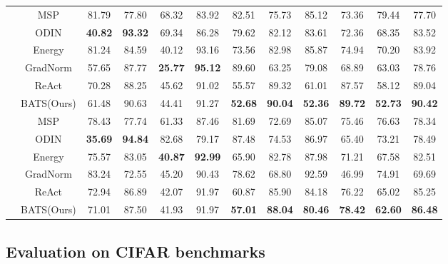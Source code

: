 \documentclass{article}
\begin{document}
\begin{table}[htbp]
{\begin{tabular}{cccccccccccc}
 & MSP\cite{hendrycks17baseline} & 81.79 & 77.80 & 68.32 & 83.92 & 82.51 & 75.73 & 85.12 & 73.36 & 79.44 & 77.70 \\
 & ODIN\cite{ODIN} & \textbf{40.82} & \textbf{93.32} & 69.34 & 86.28 & 79.62 & 82.12 & 83.61 & 72.36 & 68.35 & 83.52 \\
 & Energy\cite{liu2020energy} & 81.24 & 84.59 & 40.12 & 93.16 & 73.56 & 82.98 & 85.87 & 74.94 & 70.20 & 83.92 \\
 & GradNorm\cite{huang2021importance} & 57.65 & 87.77 & \textbf{25.77} & \textbf{95.12} & 89.60 & 63.25 & 79.08 & 68.89 & 63.03 & 78.76 \\
 & ReAct\cite{sun2021react} & 70.28 & 88.25 & 45.62 & 91.02 & 55.57 & 89.32 & 61.01 & 87.57 & 58.12 & 89.04 \\
 & BATS(Ours) & 61.48 & 90.63 & 44.41 & 91.27 & \textbf{52.68} & \textbf{90.04} & \textbf{52.36} & \textbf{89.72} & \textbf{52.73} & \textbf{90.42} \\ \hline 

  & MSP\cite{hendrycks17baseline} & 78.43 & 77.74 & 61.33 & 87.46 & 81.69 & 72.69 & 85.07 & 75.46 & 76.63 & 78.34 \\
 & ODIN\cite{ODIN} & \textbf{35.69} & \textbf{94.84} & 82.68 & 79.17 & 87.48 & 74.53 & 86.97 & 65.40 & 73.21 & 78.49 \\
 & Energy\cite{liu2020energy} & 75.57 & 83.05 & \textbf{40.87} & \textbf{92.99} & 65.90 & 82.78 & 87.98 & 71.21 & 67.58 & 82.51 \\
 & GradNorm\cite{huang2021importance} & 83.24 & 72.55 & 45.20 & 90.43 & 78.62 & 68.80 & 92.59 & 46.99 & 74.91 & 69.69 \\
 & ReAct\cite{sun2021react} & 72.94 & 86.89 & 42.07 & 91.97 & 60.87 & 85.90 & 84.18 & 76.22 & 65.02 & 85.25 \\
 & BATS(Ours) & 71.01 & 87.50 & 41.93 & 91.97 & \textbf{57.01} & \textbf{88.04} & \textbf{80.46} & \textbf{78.42} & \textbf{62.60} & \textbf{86.48} \\ \hline \end{tabular}\label{tab:CIFAR}}
\end{table}




\subsection{Evaluation on CIFAR benchmarks}
\end{document}
